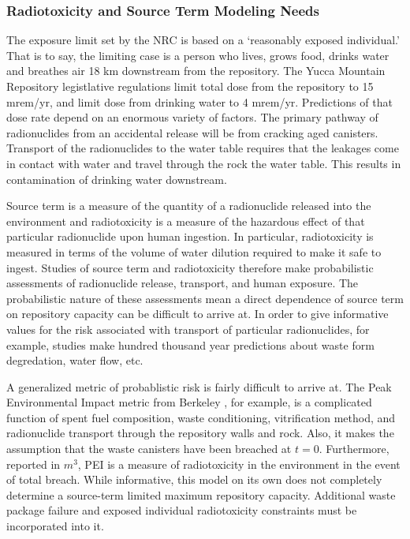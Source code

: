 \subsubsection{Radiotoxicity and Source Term Modeling Needs}

The exposure limit set by the NRC is based on a `reasonably exposed 
individual.' That is to say, the limiting case is a person who lives, 
grows food, drinks water and breathes air 18 km downstream from the 
repository. The Yucca Mountain Repository legistlative regulations 
limit total dose from the repository to 15 mrem/yr, and limit dose 
from drinking water to 4 mrem/yr.  Predictions of that dose rate 
depend on an enormous variety of factors. The primary pathway of 
radionuclides from an accidental release will be from cracking aged 
canisters. Transport of the radionuclides to the water table requires 
that the leakages come in contact with water and travel through the 
rock the water table. This results in contamination of drinking water 
downstream.  

Source term is a measure of the quantity of a radionuclide released 
into the environment and radiotoxicity is a measure of the hazardous 
effect of that particular radionuclide upon human ingestion. In 
particular, radiotoxicity is measured in terms of the volume of water 
dilution required to make it safe to ingest. Studies of source term 
and radiotoxicity therefore make probabilistic assessments of 
radionuclide release, transport, and human exposure.  The 
probabilistic nature of these assessments mean a direct dependence of 
source term on repository capacity can be difficult to arrive at. In 
order to give informative values for the risk associated with 
transport of particular radionuclides, for example, studies make 
hundred thousand year predictions about waste form degredation, water 
flow, etc.  

A generalized metric of probablistic risk is fairly difficult to 
arrive at. The Peak Environmental Impact metric from Berkeley 
\cite{bouvier_comparison_2007}, for example, is a complicated function 
of spent fuel composition, waste conditioning, vitrification method, 
and radionuclide transport through the repository walls and rock.  
Also, it makes the assumption that the waste canisters have been 
breached at $t=0$. Furthermore, reported in $m^3$, PEI is a measure of 
radiotoxicity in the environment in the event of total breach. While 
informative, this model on its own does not completely determine a 
source-term limited maximum repository capacity. Additional waste 
package failure and exposed individual radiotoxicity constraints must 
be incorporated into it.

